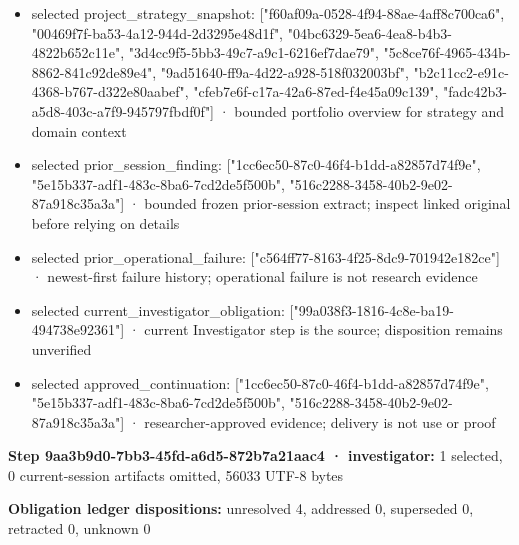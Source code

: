 \documentclass[11pt]{article}
\begin{document}
\begin{itemize}
\item selected project\_strategy\_snapshot: ["f60af09a-0528-4f94-88ae-4aff8c700ca6", "00469f7f-ba53-4a12-944d-2d3295e48d1f", "04bc6329-5ea6-4ea8-b4b3-4822b652c11e", "3d4cc9f5-5bb3-49c7-a9c1-6216ef7dae79", "5c8ce76f-4965-434b-8862-841c92de89e4", "9ad51640-ff9a-4d22-a928-518f032003bf", "b2c11cc2-e91c-4368-b767-d322e80aabef", "cfeb7e6f-c17a-42a6-87ed-f4e45a09c139", "fadc42b3-a5d8-403c-a7f9-945797fbdf0f"] · bounded portfolio overview for strategy and domain context
\item selected prior\_session\_finding: ["1cc6ec50-87c0-46f4-b1dd-a82857d74f9e", "5e15b337-adf1-483c-8ba6-7cd2de5f500b", "516c2288-3458-40b2-9e02-87a918c35a3a"] · bounded frozen prior-session extract; inspect linked original before relying on details
\item selected prior\_operational\_failure: ["c564ff77-8163-4f25-8dc9-701942e182ce"] · newest-first failure history; operational failure is not research evidence
\item selected current\_investigator\_obligation: ["99a038f3-1816-4c8e-ba19-494738e92361"] · current Investigator step is the source; disposition remains unverified
\item selected approved\_continuation: ["1cc6ec50-87c0-46f4-b1dd-a82857d74f9e", "5e15b337-adf1-483c-8ba6-7cd2de5f500b", "516c2288-3458-40b2-9e02-87a918c35a3a"] · researcher-approved evidence; delivery is not use or proof
\end{itemize}
\textbf{Step 9aa3b9d0-7bb3-45fd-a6d5-872b7a21aac4 · investigator:} 1 selected, 0 current-session artifacts omitted, 56033 UTF-8 bytes\par
\textbf{Obligation ledger dispositions:} unresolved 4, addressed 0, superseded 0, retracted 0, unknown 0\par
\end{document}

